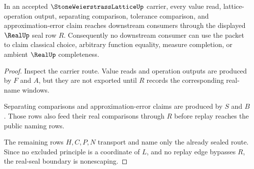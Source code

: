 \begin{theorem}
\label{thm:stone-weierstrass-lattice-real-seal-nonescape}
In an accepted $\StoneWeierstrassLatticeUp$ carrier, every value read, lattice-operation output, separating comparison, tolerance comparison, and approximation-error claim reaches downstream consumers through the displayed $\RealUp$ seal row $R$. Consequently no downstream consumer can use the packet to claim classical choice, arbitrary function equality, measure completion, or ambient $\RealUp$ completeness.
\end{theorem}
\begin{proof}
Inspect the carrier route. Value reads and operation outputs are produced by $F$ and $A$, but they are not exported until $R$ records the corresponding real-name windows.

Separating comparisons and approximation-error claims are produced by $S$ and $B$. Those rows also feed their real comparisons through $R$ before replay reaches the public naming rows.

The remaining rows $H,C,P,N$ transport and name only the already sealed route. Since no excluded principle is a coordinate of $L$, and no replay edge bypasses $R$, the real-seal boundary is nonescaping.
\end{proof}




